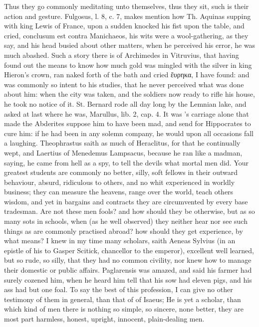 {{Thus they go commonly meditating unto themselves, thus they sit, such
is their action and gesture. Fulgosus, l. 8, c. 7, makes mention how
Th. Aquinas supping with king Lewis of France, upon a sudden knocked
his fist upon the table, and cried, conclusum est contra Manichaeos,
his wits were a wool-gathering, as they say, and his head busied about
other matters, when he perceived his error, he was much abashed.
Such a story there is of Archimedes in Vitruvius, that having found out
the means to know how much gold was mingled with the silver in king
Hieron's crown, ran naked forth of the bath and cried ἕυρηκα, I have
found: and was commonly so intent to his studies, that he never
perceived what was done about him: when the city was taken, and the
soldiers now ready to rifle his house, he took no notice of it. St.
Bernard rode all day long by the Lemnian lake, and asked at last where
he was, Marullus, lib. 2, cap. 4. It was \Democritus{}'s carriage alone
that made the Abderites suppose him to have been mad, and send for
Hippocrates to cure him: if he had been in any solemn company, he would
upon all occasions fall a laughing. Theophrastus saith as much of
Heraclitus, for that he continually wept, and Laertius of Menedemus
Lampsacus, because he ran like a madman, saying, he came from
hell as a spy, to tell the devils what mortal men did. Your greatest
students are commonly no better, silly, soft fellows in their outward
behaviour, absurd, ridiculous to others, and no whit experienced in
worldly business; they can measure the heavens, range over the world,
teach others wisdom, and yet in bargains and contracts they are
circumvented by every base tradesman. Are not these men fools? and how
should they be otherwise, but as so many sots in schools, when (as
he well observed) they neither hear nor see such things as are
commonly practised abroad? how should they get experience, by what
means? I knew in my time many scholars, saith Aeneas Sylvius (in
an epistle of his to Gasper Scitick, chancellor to the emperor),
excellent well learned, but so rude, so silly, that they had no common
civility, nor knew how to manage their domestic or public affairs.
Paglarensis was amazed, and said his farmer had surely cozened him,
when he heard him tell that his sow had eleven pigs, and his ass had
but one foal. To say the best of this profession, I can give no other
testimony of them in general, than that of \Pliny{} of Isaeus; He is
yet a scholar, than which kind of men there is nothing so simple, so
sincere, none better, they are most part harmless, honest, upright,
innocent, plain-dealing men.

}}
